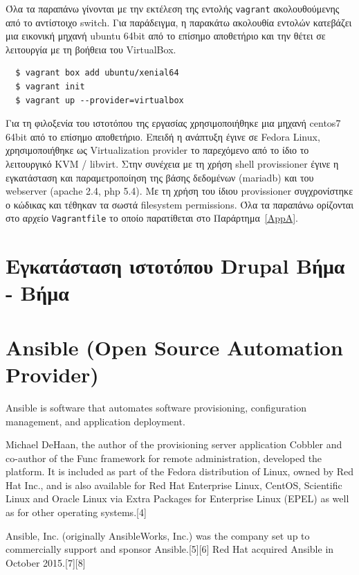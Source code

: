 \documentclass[12pt]{report}
\begin{document}
\begin{itemize}
Όλα τα παραπάνω γίνονται με την εκτέλεση της εντολής \textlatin{\texttt{vagrant}} ακολουθούμενης από το αντίστοιχο \textlatin{switch}. Για παράδειγμα, η παρακάτω ακολουθία εντολών κατεβάζει μια εικονική μηχανή \textlatin{ubuntu 64bit} από το επίσημο αποθετήριο και την θέτει σε λειτουργία με τη βοήθεια του \textlatin{VirtualBox}.
\begin{Verbatim}
  $ vagrant box add ubuntu/xenial64
  $ vagrant init
  $ vagrant up --provider=virtualbox
\end{Verbatim}

Για τη φιλοξενία του ιστοτόπου της εργασίας χρησιμοποιήθηκε μια μηχανή \textlatin{centos7 64bit} από το επίσημο αποθετήριο. Επειδή η ανάπτυξη έγινε σε \textlatin{Fedora Linux}, χρησιμοποιήθηκε ως \textlatin{Virtualization provider} το παρεχόμενο από το ίδιο το λειτουργικό \textlatin{KVM / libvirt}. Στην συνέχεια με τη χρήση \textlatin{shell provissioner} έγινε η εγκατάσταση και παραμετροποίηση της βάσης δεδομένων (\textlatin{mariadb}) και του \textlatin{webserver (apache 2.4, php 5.4)}. Με τη χρήση του ίδιου \textlatin{provissioner} συγχρονίστηκε ο κώδικας και τέθηκαν τα σωστά \textlatin{filesystem permissions}.
Όλα τα παραπάνω ορίζονται στο αρχείο \textlatin{\texttt{Vagrantfile}} το οποίο παρατίθεται στο Παράρτημα~\ref{AppA}.

\section{Εγκατάσταση ιστοτόπου \textlatin{Drupal} Βήμα - Βήμα}\label{manual_setup}

\section{\textlatin{Ansible (Open Source Automation Provider)}}\label{ansible}
Ansible is software that automates software provisioning, configuration management, and application deployment.~\cite{geerling_2015}

Michael DeHaan, the author of the provisioning server application Cobbler and co-author of the Func framework for remote administration, developed the platform. It is included as part of the Fedora distribution of Linux, owned by Red Hat Inc., and is also available for Red Hat Enterprise Linux, CentOS, Scientific Linux and Oracle Linux via Extra Packages for Enterprise Linux (EPEL) as well as for other operating systems.[4]

Ansible, Inc. (originally AnsibleWorks, Inc.) was the company set up to commercially support and sponsor Ansible.[5][6] Red Hat acquired Ansible in October 2015.[7][8]


\end{itemize}
\end{document}

